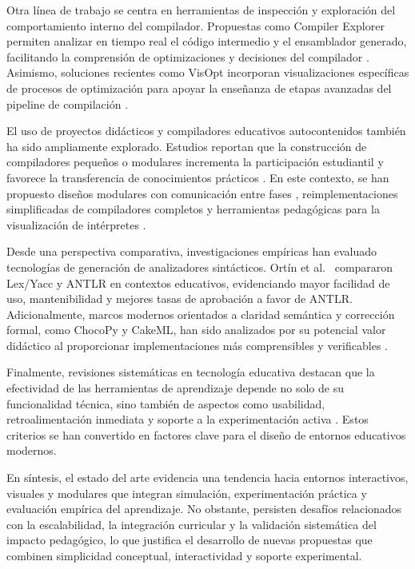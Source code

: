 Otra línea de trabajo se centra en herramientas de inspección y exploración del comportamiento interno del compilador. Propuestas como Compiler Explorer permiten analizar en tiempo real el código intermedio y el ensamblador generado, facilitando la comprensión de optimizaciones y decisiones del compilador \cite{compilerexplorer2022}. Asimismo, soluciones recientes como VisOpt incorporan visualizaciones específicas de procesos de optimización para apoyar la enseñanza de etapas avanzadas del pipeline de compilación \cite{koitzhristov2025visopt}.

El uso de proyectos didácticos y compiladores educativos autocontenidos también ha sido ampliamente explorado. Estudios reportan que la construcción de compiladores pequeños o modulares incrementa la participación estudiantil y favorece la transferencia de conocimientos prácticos \cite{Kundra2016AnER,liu2017evaluation}. En este contexto, se han propuesto diseños modulares con comunicación entre fases \cite{navas2022modular}, reimplementaciones simplificadas de compiladores completos \cite{berezun2022reimplementing} y herramientas pedagógicas para la visualización de intérpretes \cite{Spigariol2023Aprendiendo}.

Desde una perspectiva comparativa, investigaciones empíricas han evaluado tecnologías de generación de analizadores sintácticos. Ortín et al.\ \cite{ortin2022antlr} compararon Lex/Yacc y ANTLR en contextos educativos, evidenciando mayor facilidad de uso, mantenibilidad y mejores tasas de aprobación a favor de ANTLR. Adicionalmente, marcos modernos orientados a claridad semántica y corrección formal, como ChocoPy y CakeML, han sido analizados por su potencial valor didáctico al proporcionar implementaciones más comprensibles y verificables \cite{daleman2024chocopy,myreen2021cakeml}.

Finalmente, revisiones sistemáticas en tecnología educativa destacan que la efectividad de las herramientas de aprendizaje depende no solo de su funcionalidad técnica, sino también de aspectos como usabilidad, retroalimentación inmediata y soporte a la experimentación activa \cite{lu2022usability}. Estos criterios se han convertido en factores clave para el diseño de entornos educativos modernos.

En síntesis, el estado del arte evidencia una tendencia hacia entornos interactivos, visuales y modulares que integran simulación, experimentación práctica y evaluación empírica del aprendizaje. No obstante, persisten desafíos relacionados con la escalabilidad, la integración curricular y la validación sistemática del impacto pedagógico, lo que justifica el desarrollo de nuevas propuestas que combinen simplicidad conceptual, interactividad y soporte experimental.
